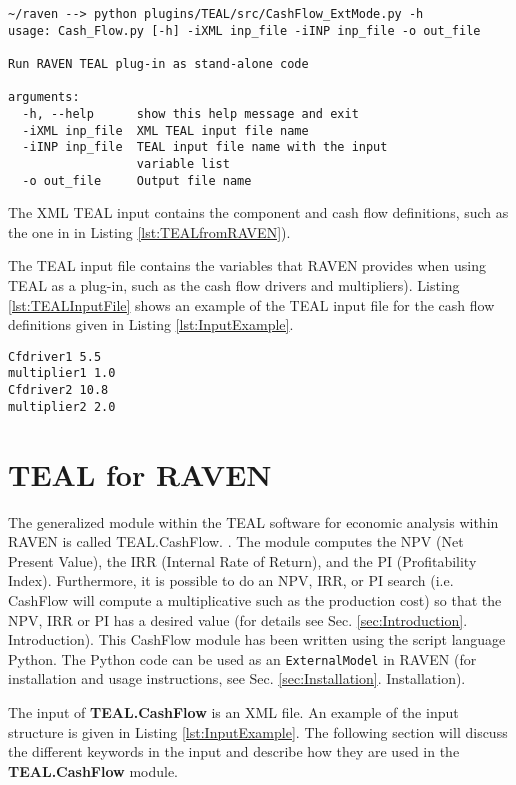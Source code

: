 \small
\begin{lstlisting}[style=XML,caption=TEAL run as stand-alone Python code, label=lst:TEALAsCode]
~/raven --> python plugins/TEAL/src/CashFlow_ExtMode.py -h
usage: Cash_Flow.py [-h] -iXML inp_file -iINP inp_file -o out_file

Run RAVEN TEAL plug-in as stand-alone code

arguments:
  -h, --help      show this help message and exit
  -iXML inp_file  XML TEAL input file name
  -iINP inp_file  TEAL input file name with the input
                  variable list
  -o out_file     Output file name
\end{lstlisting}
\normalsize

The XML TEAL input contains the component and cash flow definitions, such as the one in  in Listing \ref{lst:TEALfromRAVEN}).

The TEAL input file contains the variables that RAVEN provides when using TEAL as a plug-in, such as the cash flow drivers and multipliers).
Listing \ref{lst:TEALInputFile} shows an example of the TEAL input file for the cash flow definitions given in Listing \ref{lst:InputExample}.

\begin{lstlisting}[caption=TEAL run as stand-alone Python code, label=lst:TEALInputFile]
Cfdriver1 5.5
multiplier1 1.0
Cfdriver2 10.8
multiplier2 2.0
\end{lstlisting}

\section{TEAL for RAVEN}
The generalized module within the TEAL software for economic analysis within RAVEN is called TEAL.CashFlow. \cite{MSApril2017}. The module computes
the NPV (Net Present Value), the IRR (Internal Rate of Return), and the PI (Profitability Index). Furthermore, it is possible to
do an NPV, IRR, or PI search (i.e. CashFlow will compute a multiplicative such as the production cost) so that the
NPV, IRR or PI has a desired value (for details see Sec. \ref{sec:Introduction}. Introduction). This CashFlow module has been written using the script language Python.
The Python code can be used as an \texttt{ExternalModel} in RAVEN (for installation and usage instructions, see Sec. \ref{sec:Installation}. Installation).

The input of \textbf{TEAL.CashFlow} is an XML file. An example of the input structure is given in Listing \ref{lst:InputExample}. The following section will discuss the
 different keywords in the input and describe how they are used in the \textbf{TEAL.CashFlow} module.


